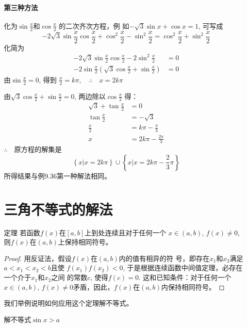 \paragraph{第三种方法} 化为$\sin\frac{x}{2}$和$\cos \frac{x}{2}$
的二次齐次方程，例
如$-\sqrt{3}\sin x+\cos x=1$, 可写成
\[-2\sqrt{3}\sin\frac{x}{2}\cos \frac{x}{2}+\cos^2\frac{x}{2}-\sin^2\frac{x}{2}=\cos^2\frac{x}{2}+\sin^2\frac{x}{2}\]
化简为
\[\begin{split}
    -2\sqrt{3}\sin\frac{x}{2}\cos\frac{x}{2}-2\sin^2\frac{x}{2}&=0\\
    -2\sin\frac{x}{2}\left(\sqrt{3}\cos\frac{x}{2}+\sin\frac{x}{2}\right)&=0
\end{split}\]
由$\sin\frac{x}{2}=0$, 得到
$\frac{x}{2}=k\pi ,\quad \therefore\quad x=2k\pi $

由$\sqrt{3}\cos\frac{x}{2}+\sin \frac{x}{2}=0$, 两边除以$\cos\frac{x}{2}$
得：
\[\begin{split}
    \sqrt{3}+\tan\frac{x}{2} &=0\\
    \tan\frac{x}{2}&=-\sqrt{3}\\
    \frac{x}{2}&=k\pi-\frac{\pi}{3}\\
    x&=2k\pi-\frac{2\pi}{3}
\end{split}\]
$\therefore\quad $原方程的解集是
\[\left\{x\big|x=2k\pi\right\}\cup \left\{x\big|x=2k\pi-\frac{2}{3}\pi\right\}\]
所得结果与例9.36第一种解法相同。

\section{三角不等式的解法}
\begin{blk}{定理}
    若函数$f(x)$在$[a,b]$上到处连续且对于任何一个
$x\in (a,b)$, $f(x)\ne 0$, 则$f(x)$在$(a,b)$上保持相同符号。
\end{blk}

\begin{proof}
    用反证法，假设$f(x)$在$(a,b)$内的值有相异的符
号，即存在$x_1$和$x_2$满足$a<x_1<x_2<b$且使
$f(x_1)f(x_2)<0$,
于是根据连续函数中间值定理，必存在一个介于$x_1$和$x_2$之间
的常数$c$, 使得$f(c)=0$. 这和已知条件：对于任何一个$x\in
(a,b)$, $f(x)\ne 0$矛盾，因此，$f(x)$在$(a,b)$内保持相同符号。
\end{proof}

我们举例说明如何应用这个定理解不等式。


\begin{example}
    解不等式$\sin x>a$
\end{example}

